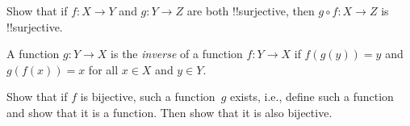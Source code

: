 \documentclass[../../include/open-logic-section]{subfiles}
\begin{document}
\begin{prob}
Show that if $f \colon X \to Y$ and $g \colon Y \to Z$ are both
!!{surjective}, then $g \circ f \colon X \to Z$ is !!{surjective}.
\end{prob}

\begin{prob}
A function $g \colon Y \to X$ is the \emph{inverse} of a function $f
\colon Y \to X$ if $f(g(y)) = y$ and $g(f(x)) = x$ for all $x \in X$
and $y \in Y$.

Show that if $f$ is bijective, such a function~$g$ exists, i.e.,
define such a function and show that it is a function. Then show that
it is also bijective.
\end{prob}
\end{document}
